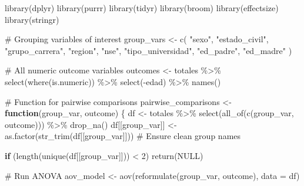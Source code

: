 \documentclass[
  letterpaper,
  DIV=11,
  numbers=noendperiod]{scrartcl}
\newenvironment{Shaded}{\begin{snugshade}}{\end{snugshade}}
\newcommand{\AttributeTok}[1]{\textcolor[rgb]{0.40,0.45,0.13}{#1}}
\newcommand{\CommentTok}[1]{\textcolor[rgb]{0.37,0.37,0.37}{#1}}
\newcommand{\ConstantTok}[1]{\textcolor[rgb]{0.56,0.35,0.01}{#1}}
\newcommand{\ControlFlowTok}[1]{\textcolor[rgb]{0.00,0.23,0.31}{\textbf{#1}}}
\newcommand{\DecValTok}[1]{\textcolor[rgb]{0.68,0.00,0.00}{#1}}
\newcommand{\FunctionTok}[1]{\textcolor[rgb]{0.28,0.35,0.67}{#1}}
\newcommand{\NormalTok}[1]{\textcolor[rgb]{0.00,0.23,0.31}{#1}}
\newcommand{\OtherTok}[1]{\textcolor[rgb]{0.00,0.23,0.31}{#1}}
\newcommand{\SpecialCharTok}[1]{\textcolor[rgb]{0.37,0.37,0.37}{#1}}
\newcommand{\StringTok}[1]{\textcolor[rgb]{0.13,0.47,0.30}{#1}}
\begin{document}
\begin{Shaded}
\begin{Highlighting}[]
\FunctionTok{library}\NormalTok{(dplyr)}
\FunctionTok{library}\NormalTok{(purrr)}
\FunctionTok{library}\NormalTok{(tidyr)}
\FunctionTok{library}\NormalTok{(broom)}
\FunctionTok{library}\NormalTok{(effectsize)}
\FunctionTok{library}\NormalTok{(stringr)}

\CommentTok{\# Grouping variables of interest}
\NormalTok{group\_vars }\OtherTok{\textless{}{-}} \FunctionTok{c}\NormalTok{(}
  \StringTok{"sexo"}\NormalTok{, }\StringTok{"estado\_civil"}\NormalTok{, }\StringTok{"grupo\_carrera"}\NormalTok{, }\StringTok{"region"}\NormalTok{, }\StringTok{"nse"}\NormalTok{,}
  \StringTok{"tipo\_universidad"}\NormalTok{, }\StringTok{"ed\_padre"}\NormalTok{, }\StringTok{"ed\_madre"}
\NormalTok{)}

\CommentTok{\# All numeric outcome variables}
\NormalTok{outcomes }\OtherTok{\textless{}{-}}\NormalTok{ totales }\SpecialCharTok{\%\textgreater{}\%} \FunctionTok{select}\NormalTok{(}\FunctionTok{where}\NormalTok{(is.numeric)) }\SpecialCharTok{\%\textgreater{}\%} \FunctionTok{select}\NormalTok{(}\SpecialCharTok{{-}}\NormalTok{edad) }\SpecialCharTok{\%\textgreater{}\%} \FunctionTok{names}\NormalTok{()}

\CommentTok{\# Function for pairwise comparisons}
\NormalTok{pairwise\_comparisons }\OtherTok{\textless{}{-}} \ControlFlowTok{function}\NormalTok{(group\_var, outcome) \{}
\NormalTok{  df }\OtherTok{\textless{}{-}}\NormalTok{ totales }\SpecialCharTok{\%\textgreater{}\%} \FunctionTok{select}\NormalTok{(}\FunctionTok{all\_of}\NormalTok{(}\FunctionTok{c}\NormalTok{(group\_var, outcome))) }\SpecialCharTok{\%\textgreater{}\%} \FunctionTok{drop\_na}\NormalTok{()}
\NormalTok{  df[[group\_var]] }\OtherTok{\textless{}{-}} \FunctionTok{as.factor}\NormalTok{(}\FunctionTok{str\_trim}\NormalTok{(df[[group\_var]]))  }\CommentTok{\# Ensure clean group names}
  
  \ControlFlowTok{if}\NormalTok{ (}\FunctionTok{length}\NormalTok{(}\FunctionTok{unique}\NormalTok{(df[[group\_var]])) }\SpecialCharTok{\textless{}} \DecValTok{2}\NormalTok{) }\FunctionTok{return}\NormalTok{(}\ConstantTok{NULL}\NormalTok{)}
  
  \CommentTok{\# Run ANOVA}
\NormalTok{  aov\_model }\OtherTok{\textless{}{-}} \FunctionTok{aov}\NormalTok{(}\FunctionTok{reformulate}\NormalTok{(group\_var, outcome), }\AttributeTok{data =}\NormalTok{ df)}
  

\end{Highlighting}
\end{Shaded}
\end{document}
